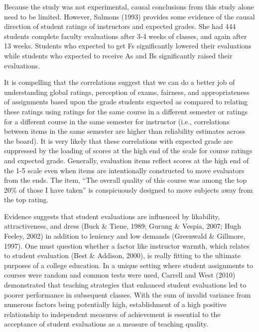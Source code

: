 \documentclass[man]{apa6}
\theoremstyle{definition}
\theoremstyle{definition}
\theoremstyle{definition}
\theoremstyle{remark}
\begin{document}
Because the study was not experimental, causal conclusions from this study alone need to be limited. However, Salmons (1993) provides some evidence of the causal direction of student ratings of instructors and expected grades. She had 444 students complete faculty evaluations after 3-4 weeks of classes, and again after 13 weeks. Students who expected to get Fs significantly lowered their evaluations while students who expected to receive As and Bs significantly raised their evaluations.

It is compelling that the correlations suggest that we can do a better job of understanding global ratings, perception of exams, fairness, and appropriateness of assignments based upon the grade students expected as compared to relating these ratings using ratings for the same course in a different semester or ratings for a different course in the same semester for instructor (i.e., correlations between items in the same semester are higher than reliability estimates across the board). It is very likely that these correlations with expected grade are suppressed by the loading of scores at the high end of the scale for course ratings and expected grade. Generally, evaluation items reflect scores at the high end of the 1-5 scale even when items are intentionally constructed to move evaluators from the ends. The item, \enquote{The overall quality of this course was among the top 20\% of those I have taken} is conspicuously designed to move subjects away from the top rating.

Evidence suggests that student evaluations are influenced by likability, attractiveness, and dress (Buck \& Tiene, 1989; Gurung \& Vespia, 2007; Hugh Feeley, 2002) in addition to leniency and low demands (Greenwald \& Gillmore, 1997). One must question whether a factor like instructor warmth, which relates to student evaluation (Best \& Addison, 2000), is really fitting to the ultimate purposes of a college education. In a unique setting where student assignments to courses were random and common tests were used, Carrell and West (2010) demonstrated that teaching strategies that enhanced student evaluations led to poorer performance in subsequent classes. With the sum of invalid variance from numerous factors being potentially high, establishment of a high positive relationship to independent measures of achievement is essential to the acceptance of student evaluations as a measure of teaching quality.
\end{document}
